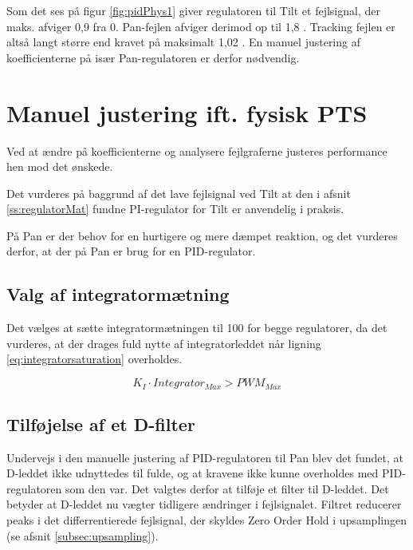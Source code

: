 Som det ses på figur \ref{fig:pidPhys1} giver regulatoren til Tilt et fejlsignal,
der maks. afviger 0,9 \degree{} fra 0.
Pan-fejlen afviger derimod op til 1,8 \degree{}.
Tracking fejlen er altså langt større end kravet på maksimalt 1,02 \degree.
En manuel justering af koefficienterne på især Pan-regulatoren er derfor nødvendig.

\section{Manuel justering ift. fysisk PTS}
Ved at ændre på koefficienterne og analysere fejlgraferne justeres performance 
hen mod det ønskede.

Det vurderes på baggrund af det lave fejlsignal ved Tilt at den i afsnit \ref{ss:regulatorMat} fundne
PI-regulator for Tilt er anvendelig i praksis.

På Pan er der behov for en hurtigere og mere dæmpet reaktion,
og det vurderes derfor, at der på Pan er brug for en PID-regulator.

\subsection{Valg af integratormætning}
Det vælges at sætte integratormætningen til 100 for begge regulatorer, da det vurderes, at der drages
fuld nytte af integratorleddet når ligning \ref{eq:integratorsaturation} 
overholdes.

\begin{equation}
	K_I \cdot Integrator_{Max} > PWM_{Max}
\label{eq:integratorsaturation} 
\end{equation}


\subsection{Tilføjelse af et D-filter}
Undervejs i den manuelle justering af PID-regulatoren til Pan blev det fundet, at D-leddet ikke udnyttedes til fulde,
og at kravene ikke kunne overholdes med PID-regulatoren som den var.
Det valgtes derfor at tilføje et filter til D-leddet. 
Det betyder at D-leddet nu vægter tidligere ændringer i fejlsignalet. 
Filtret reducerer peaks i det differrentierede fejlsignal, der skyldes Zero Order Hold i upsamplingen (se afsnit \ref{subsec:upsampling}).

